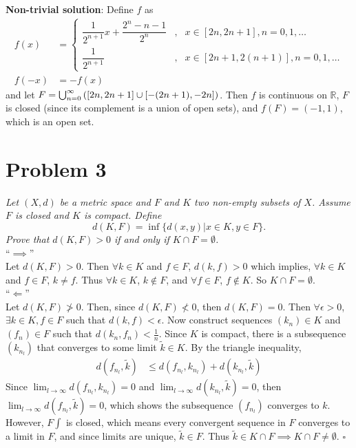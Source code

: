 \documentclass[12pt]{article}
\begin{document}
\noindent\textbf{Non-trivial solution}: Define $f$ as
\begin{align*}
  f(x) &= \left\{\begin{array}{lcl}
    \dfrac{1}{2^{n+1}}x + \dfrac{2^n - n - 1}{2^n} &,& x \in [2n, 2n+1], n = 0, 1, \dots \\[.3cm]
    \dfrac{1}{2^{n+1}} &,& x \in [2n + 1, 2(n+1)], n = 0, 1, \dots
  \end{array}\right. \\
  f(-x) &= -f(x)
\end{align*}
and let $F = \bigcup_{n=0}^{\infty}\qty([2n,2n+1]\cup[-(2n+1),-2n])$.  Then $f$ is continuous on $\mathbb{R}$, $F$ is closed (since its complement is a union of open sets), and $f(F) = (-1, 1)$, which is an open set.

\vspace{5cm}

\section*{Problem 3}
{\it Let $(X,d)$ be a metric space and $F$ and $K$ two non-empty subsets of $X$.  Assume $F$ is closed and $K$ is compact.  Define}
\begin{equation}
	\label{problem_3_definition}
	d(K, F) = \inf\{d(x, y) | x \in K, y \in F\}.
\end{equation}
{\it Prove that $d(K, F) > 0$ if and only if $K \cap F = \emptyset$.} \\

\noindent ``$\implies$'' \\

Let $d(K, F) > 0$.  Then $\forall k\in K$ and $f\in F$, $d(k, f) > 0$ which implies, $\forall k\in K$ and $f\in F$, $k \neq f$.  Thus $\forall k \in K$, $k\notin F$, and $\forall f \in F$, $f \notin K$.  So $K \cap F = \emptyset$. \\

\noindent ``$\Longleftarrow$'' \\

Let $d(K, F) \not> 0$.  Then, since $d(K,F) \not< 0$, then $d(K,F) = 0$.  Then $\forall \epsilon > 0$, $\exists k \in K, f \in F$ such that $d(k, f) < \epsilon$.  Now construct sequences $(k_n) \in K$ and $(f_n) \in F$ such that $d(k_n, f_n) < \frac{1}{n}$.  Since $K$ is compact, there is a subsequence $(k_{n_l})$ that converges to some limit $\tilde{k} \in K$.  By the triangle inequality,
\begin{align*}
  d(f_{n_l}, \tilde{k}) &\leq d(f_{n_l}, k_{n_l}) + d(k_{n_l}, \tilde{k})
\end{align*}
Since $\lim_{l\rightarrow\infty} d(f_{n_l}, k_{n_l}) = 0$ and $\lim_{l\rightarrow\infty} d(k_{n_l}, \tilde{k}) = 0$, then $\lim_{l\rightarrow\infty} d(f_{n_l}, \tilde{k}) = 0$, which shows the subsequence $(f_{n_l})$ converges to $k$.  However, $F∫$ is closed, which means every convergent sequence in $F$ converges to a limit in $F$, and since limits are unique, $\tilde{k} \in F$.  Thus $\tilde{k} \in K \cap F \implies K \cap F \neq \emptyset$. \hfill $\square$
\end{document}
